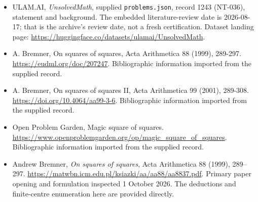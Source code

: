 \documentclass[11pt,a4paper]{article}
\begin{document}
{\small

\begin{itemize}

\item[\hypertarget{source:1243:1}{S1}] ULAM.AI, \emph{UnsolvedMath}, supplied \texttt{problems.json}, record 1243 (NT-036), statement and background. The embedded literature-review date is 2026-08-17; that is the archive’s review date, not a fresh certification. Dataset landing page: \url{https://huggingface.co/datasets/ulamai/UnsolvedMath}.

\item[\hypertarget{source:1243:2}{S2}] A. Bremner, On squares of squares, Acta Arithmetica 88 (1999), 289-297. \url{https://eudml.org/doc/207247}. Bibliographic information imported from the supplied record.

\item[\hypertarget{source:1243:3}{S3}] A. Bremner, On squares of squares II, Acta Arithmetica 99 (2001), 289-308. \url{https://doi.org/10.4064/aa99-3-6}. Bibliographic information imported from the supplied record.

\item[\hypertarget{source:1243:4}{S4}] Open Problem Garden, Magic square of squares. \url{https://www.openproblemgarden.org/op/magic_square_of_squares}. Bibliographic information imported from the supplied record.


\item[E1] Andrew Bremner, \emph{On squares of squares},
Acta Arithmetica 88 (1999), 289--297.
\url{https://matwbn.icm.edu.pl/ksiazki/aa/aa88/aa8837.pdf}.
Primary paper opening and formulation inspected 1 October 2026.
The deductions and finite-centre enumeration here are provided directly.

\end{itemize}

}

\label{end:1243}
\end{document}
